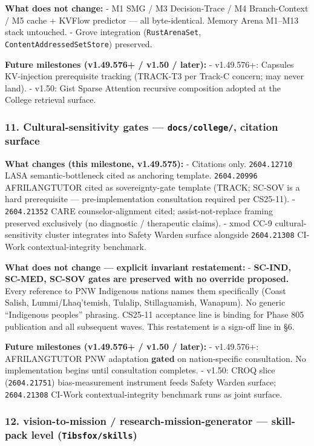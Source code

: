 \documentclass[11pt,letterpaper]{article}
\newcommand{\arxivid}[1]{\texttt{\textcolor{accent}{#1}}}
\begin{document}
\textbf{What does not change:} - M1 SMG / M3 Decision-Trace / M4
Branch-Context / M5 cache + KVFlow predictor --- all byte-identical.
Memory Arena M1--M13 stack untouched. - Grove integration
(\texttt{RustArenaSet}, \texttt{ContentAddressedSetStore}) preserved.

\textbf{Future milestones (v1.49.576+ / v1.50 / later):} - v1.49.576+:
Capsules KV-injection prerequisite tracking (TRACK-T3 per Track-C
concern; may never land). - v1.50: Gist Sparse Attention recursive
composition adopted at the College retrieval surface.

\subsubsection{\texorpdfstring{11. Cultural-sensitivity gates ---
\texttt{docs/college/}, citation
surface}{11. Cultural-sensitivity gates --- docs/college/, citation surface}}

\textbf{What changes (this milestone, v1.49.575):} - Citations only.
\arxivid{2604.12710} LASA semantic-bottleneck cited as anchoring
template. \arxivid{2604.20996} AFRILANGTUTOR cited as sovereignty-gate
template (TRACK; SC-SOV is a hard prerequisite --- pre-implementation
consultation required per CS25-11). - \arxivid{2604.21352} CARE
counselor-alignment cited; assist-not-replace framing preserved
exclusively (no diagnostic / therapeutic claims). - xmod CC-9
cultural-sensitivity cluster integrates into Safety Warden surface
alongside \arxivid{2604.21308} CI-Work contextual-integrity benchmark.

\textbf{What does not change --- explicit invariant restatement:} -
\textbf{SC-IND, SC-MED, SC-SOV gates are preserved with no override
proposed.} Every reference to PNW Indigenous nations names them
specifically (Coast Salish, Lummi/Lhaq'temish, Tulalip, Stillaguamish,
Wanapum). No generic ``Indigenous peoples'' phrasing. CS25-11 acceptance
line is binding for Phase 805 publication and all subsequent waves. This
restatement is a sign-off line in §6.

\textbf{Future milestones (v1.49.576+ / v1.50 / later):} - v1.49.576+:
AFRILANGTUTOR PNW adaptation \textbf{gated} on nation-specific
consultation. No implementation begins until consultation completes. -
v1.50: CROQ slice (\arxivid{2604.21751}) bias-measurement instrument
feeds Safety Warden surface; \arxivid{2604.21308} CI-Work
contextual-integrity benchmark runs as joint surface.

\subsubsection{\texorpdfstring{12. vision-to-mission /
research-mission-generator --- skill-pack level
(\texttt{Tibsfox/skills})}{12. vision-to-mission / research-mission-generator --- skill-pack level (Tibsfox/skills)}}
\end{document}
